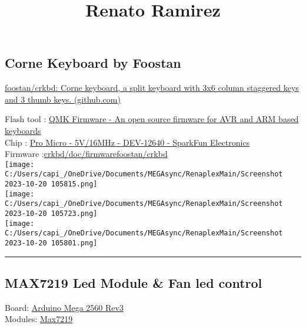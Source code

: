 \documentclass[
]{article}
\title{Renato Ramirez}
\author{}
\date{}
\begin{document}
\maketitle

\subsection{Corne Keyboard by Foostan}\label{corne-keyboard-by-foostan}

\href{https://github.com/foostan/crkbd}{foostan/crkbd: Corne keyboard, a
split keyboard with 3x6 column staggered keys and 3 thumb keys.
(github.com)}

Flash tool : \href{https://qmk.fm/}{QMK Firmware - An open source
firmware for AVR and ARM based keyboards}\\
Chip : \href{https://www.sparkfun.com/products/12640}{Pro Micro -
5V/16MHz - DEV-12640 - SparkFun Electronics}\\
Firmware
:\href{https://github.com/foostan/crkbd/blob/main/doc/firmware_en.md}{crkbd/doc/firmwarefoostan/crkbd}\\
\texttt{[image: C:/Users/capi\_/OneDrive/Documents/MEGAsync/RenaplexMain/Screenshot 2023-10-20 105815.png]}\\
\texttt{[image: C:/Users/capi\_/OneDrive/Documents/MEGAsync/RenaplexMain/Screenshot 2023-10-20 105723.png]}\\
\texttt{[image: C:/Users/capi\_/OneDrive/Documents/MEGAsync/RenaplexMain/Screenshot 2023-10-20 105801.png]}

\begin{center}\rule{0.5\linewidth}{0.5pt}\end{center}

\subsection{MAX7219 Led Module \& Fan led
control}\label{max7219-led-module-fan-led-control}

Board:
\href{https://store.arduino.cc/products/arduino-mega-2560-rev3}{Arduino
Mega 2560 Rev3}\\
Modules:
\href{https://projecthub.arduino.cc/mdraber/controlling-8x8-dot-matrix-with-max7219-and-arduino-0c417a}{Max7219}
\end{document}
